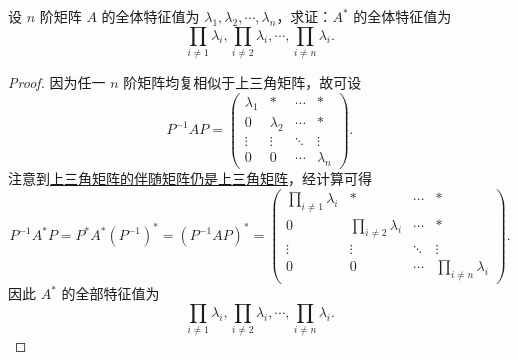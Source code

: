 \documentclass[../../main.tex]{subfiles}
\begin{document}
\begin{proposition}[伴随矩阵的特征值]\label{proposition:伴随矩阵的特征值}
设 \( n \) 阶矩阵 \( A \) 的全体特征值为 \( \lambda_1, \lambda_2, \cdots, \lambda_n \)，求证：\( A^* \) 的全体特征值为 
\[
\prod_{i \neq 1} \lambda_i, \prod_{i \neq 2} \lambda_i, \cdots, \prod_{i \neq n} \lambda_i.
\]
\end{proposition}
\begin{proof}
因为任一 \( n \) 阶矩阵均复相似于上三角矩阵，故可设
\[
P^{-1}AP = 
\begin{pmatrix}
\lambda_1 & * & \cdots & * \\
0 & \lambda_2 & \cdots & * \\
\vdots & \vdots & \ddots & \vdots \\
0 & 0 & \cdots & \lambda_n
\end{pmatrix}.
\]
注意到\hyperref[proposition:上三角阵性质]{上三角矩阵的伴随矩阵仍是上三角矩阵}，经计算可得
\[
P^{-1}A^*P = P^*A^*(P^{-1})^* = (P^{-1}AP)^* = 
\begin{pmatrix}
\prod_{i \neq 1} \lambda_i & * & \cdots & * \\
0 & \prod_{i \neq 2} \lambda_i & \cdots & * \\
\vdots & \vdots & \ddots & \vdots \\
0 & 0 & \cdots & \prod_{i \neq n} \lambda_i
\end{pmatrix}.
\]
因此 \( A^* \) 的全部特征值为
\[
\prod_{i \neq 1} \lambda_i, \prod_{i \neq 2} \lambda_i, \cdots, \prod_{i \neq n} \lambda_i.
\]

\end{proof}
\end{document}
